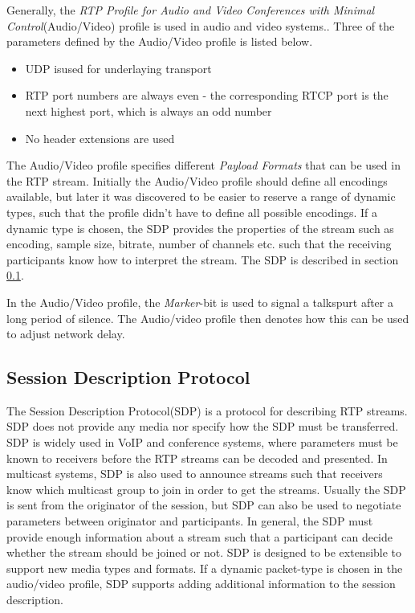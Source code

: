 Generally, the \textit{RTP Profile for Audio and Video Conferences with Minimal Control}\citep{RFC3551}(Audio/Video) profile is used in audio and video systems.\citep{perkins2003rtp}.
Three of the parameters defined by the Audio/Video profile is listed below.
\begin{itemize}
	\item UDP isused for underlaying transport
	\item RTP port numbers are always even - the corresponding RTCP port is the next highest port, which is always an odd number
	\item No header extensions are used
\end{itemize} \citep{johnston2004sip}

The Audio/Video profile specifies different \textit{Payload Formats} that can be used in the RTP stream. Initially the Audio/Video profile should define all encodings available, but later it was discovered to be easier to reserve a range of dynamic types, such that the profile didn't have to define all possible encodings. If a dynamic type is chosen, the SDP provides the properties of the stream such as encoding, sample size, bitrate, number of channels etc. such that the receiving participants know how to interpret the stream.
The SDP is described in section \ref{sec:design:sdp}.

In the Audio/Video profile, the \textit{Marker}-bit is used to signal a talkspurt after a long period of silence. The Audio/video profile then denotes how this can be used to adjust network delay.

\subsection{Session Description Protocol} \label{sec:design:sdp}
The Session Description Protocol(SDP) is a protocol for describing RTP streams.
SDP does not provide any media nor specify how the SDP must be transferred.
SDP is widely used in VoIP and conference systems, where parameters must be known to receivers before the RTP streams can be decoded and presented.
In multicast systems, SDP is also used to announce streams such that receivers know which multicast group to join in order to get the streams. Usually the SDP is sent from the originator of the session, but SDP can also be used to negotiate parameters between originator and participants.
In general, the SDP must provide enough information about a stream such that a participant can decide whether the stream should be joined or not.
SDP is designed to be extensible to support new media types and formats.
If a dynamic packet-type is chosen in the audio/video profile, SDP supports adding additional information to the session description. 

